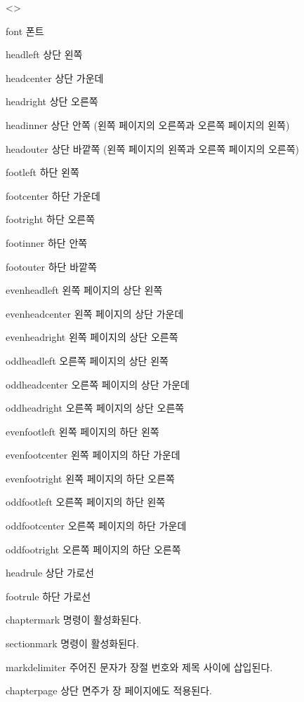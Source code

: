 \documentclass[minted]{hzguide}
\begin{document}
\begin{code}
\end{code}

\begin{macros}<\PageStyleSetup>
\item[font] \keyvalue{\rmfamily\small}
폰트

\item[headleft] 
상단 왼쪽 

\item[headcenter] 상단 가운데 
\item[headright] 상단 오른쪽
\item[headinner] 상단 안쪽 (왼쪽 페이지의 오른쪽과 오른쪽 페이지의 왼쪽)
\item[headouter] 상단 바깥쪽 (왼쪽 페이지의 왼쪽과 오른쪽 페이지의 오른쪽)
\item[footleft] 하단 왼쪽
\item[footcenter] 하단 가운데 
\item[footright] 하단 오른쪽 
\item[footinner] 하단 안쪽
\item[footouter] 하단 바깥쪽
\item[evenheadleft] 왼쪽 페이지의 상단 왼쪽
\item[evenheadcenter] 왼쪽 페이지의 상단 가운데
\item[evenheadright] 왼쪽 페이지의 상단 오른쪽
\item[oddheadleft] 오른쪽 페이지의 상단 왼쪽
\item[oddheadcenter] 오른쪽 페이지의 상단 가운데
\item[oddheadright] 오른쪽 페이지의 상단 오른쪽
\item[evenfootleft] 왼쪽 페이지의 하단 왼쪽
\item[evenfootcenter] 왼쪽 페이지의 하단 가운데
\item[evenfootright] 왼쪽 페이지의 하단 오른쪽
\item[oddfootleft] 오른쪽 페이지의 하단 왼쪽
\item[oddfootcenter] 오른쪽 페이지의 하단 가운데
\item[oddfootright] 오른쪽 페이지의 하단 오른쪽
\item[headrule] \keyvalueTF 
상단 가로선
\item[footrule] \keyvalueTF 
하단 가로선
\item[chaptermark] \keyvalueTF 
\macro{\chaptermark} 명령이 활성화된다.
\item[sectionmark] \keyvalueTF 
\macro{\sectionmark} 명령이 활성화된다.
\item[markdelimiter] \keyvalue{\quad}
주어진 문자가 장절 번호와 제목 사이에 삽입된다.
\item[chapterpage] \keyvalueTF 
상단 면주가 장 페이지에도 적용된다.
\end{macros}
\end{document}
